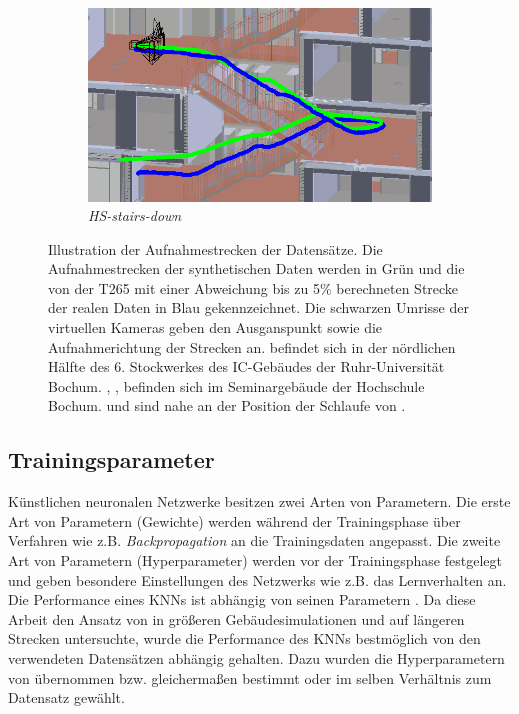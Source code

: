 \begin{figure}
\begin{subfigure}[tl]{0.45\linewidth}
		\flushright		\includegraphics[width=\linewidth]{images/trajectories/hs_down.png}
		\caption{\textit{HS-stairs-down}}
		\label{subfig:traj_hs-down}
	\end{subfigure}
	\hfill
	\caption{Illustration der Aufnahmestrecken der Datensätze. Die Aufnahmestrecken der synthetischen Daten werden in Grün und die von der T265 mit einer Abweichung bis zu 5\% berechneten Strecke der realen Daten in Blau gekennzeichnet. Die schwarzen Umrisse der virtuellen Kameras geben den Ausganspunkt sowie die Aufnahmerichtung der Strecken an.  befindet sich in der nördlichen Hälfte des 6. Stockwerkes des IC-Gebäudes der Ruhr-Universität Bochum. , ,  befinden sich im Seminargebäude der Hochschule Bochum.  und  sind nahe an der Position der Schlaufe von .}
	\label{fig:trajectories}
\end{figure}

\subsection{Trainingsparameter}
\label{sec:trainingsparameter}
Künstlichen neuronalen Netzwerke besitzen zwei Arten von Parametern. Die erste Art von Parametern (Gewichte) werden während der Trainingsphase über Verfahren wie z.B. \textit{Backpropagation} an die Trainingsdaten angepasst.
Die zweite Art von Parametern (Hyperparameter) werden vor der Trainingsphase festgelegt und geben besondere Einstellungen des Netzwerks wie z.B. das Lernverhalten an. Die Performance eines KNNs ist abhängig von seinen Parametern \cite{goodfellowDeepLearning2016}. Da diese Arbeit den Ansatz von \citet{acharyaBIMPoseNetIndoorCamera2019} in größeren Gebäudesimulationen und auf längeren Strecken untersuchte, wurde die Performance des KNNs bestmöglich von den verwendeten Datensätzen abhängig gehalten. Dazu wurden die Hyperparametern von \citet{acharyaBIMPoseNetIndoorCamera2019} übernommen bzw. gleichermaßen bestimmt oder im selben Verhältnis zum Datensatz gewählt.

